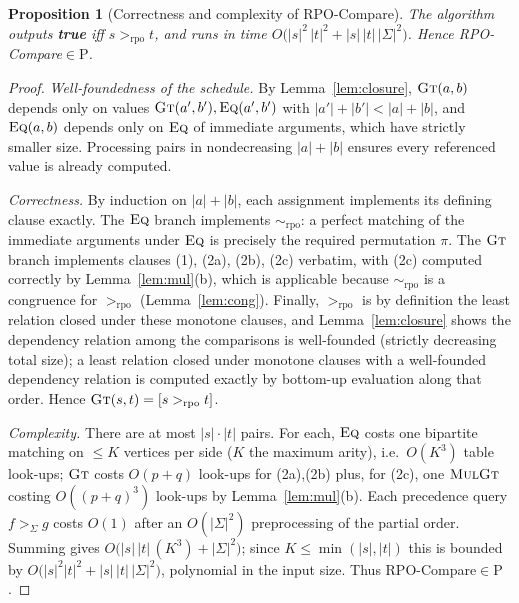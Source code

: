\documentclass{amsart}
\newtheorem{proposition}{Proposition}
\theoremstyle{definition}
\theoremstyle{remark}
\newcommand{\rpo}{>_{\mathrm{rpo}}}
\newcommand{\sig}{\Sigma}
\newcommand{\prc}{>_{\sig}}
\newcommand{\size}[1]{|#1|}
\begin{document}
\begin{proposition}[Correctness and complexity of {\sc RPO-Compare}]\label{prop:rpo}
The algorithm outputs \textbf{true} iff $s\rpo t$, and runs in time
$O\bigl(\size{s}^2\,\size{t}^2+\size{s}\,\size{t}\,\size{\sig}^2\bigr)$. Hence
{\sc RPO-Compare}$\in\mathrm{P}$.
\end{proposition}

\begin{proof}
\emph{Well-foundedness of the schedule.} By Lemma~\ref{lem:closure},
$\textsc{Gt}(a,b)$ depends only on values $\textsc{Gt}(a',b'),\textsc{Eq}(a',b')$
with $\size{a'}+\size{b'}<\size{a}+\size{b}$, and $\textsc{Eq}(a,b)$ depends only
on $\textsc{Eq}$ of immediate arguments, which have strictly smaller size.
Processing pairs in nondecreasing $\size{a}+\size{b}$ ensures every referenced
value is already computed.

\emph{Correctness.} By induction on $\size{a}+\size{b}$, each assignment
implements its defining clause exactly. The $\textsc{Eq}$ branch implements
$\sim_{\mathrm{rpo}}$: a perfect matching of the immediate arguments under
$\textsc{Eq}$ is precisely the required permutation $\pi$. The $\textsc{Gt}$
branch implements clauses (1), (2a), (2b), (2c) verbatim, with (2c) computed
correctly by Lemma~\ref{lem:mul}(b), which is applicable because
$\sim_{\mathrm{rpo}}$ is a congruence for $\rpo$ (Lemma~\ref{lem:cong}). Finally,
$\rpo$ is by definition the least relation closed under these monotone clauses,
and Lemma~\ref{lem:closure} shows the dependency relation among the comparisons
is well-founded (strictly decreasing total size); a least relation closed under
monotone clauses with a well-founded dependency relation is computed exactly by
bottom-up evaluation along that order. Hence $\textsc{Gt}(s,t)=[s\rpo t]$.

\emph{Complexity.} There are at most $\size{s}\cdot\size{t}$ pairs. For each,
$\textsc{Eq}$ costs one bipartite matching on $\le K$ vertices per side ($K$ the
maximum arity), i.e.\ $O(K^{3})$ table look-ups; $\textsc{Gt}$ costs $O(p+q)$
look-ups for (2a),(2b) plus, for (2c), one $\textsc{MulGt}$ costing $O((p+q)^{3})$
look-ups by Lemma~\ref{lem:mul}(b). Each precedence query $f\prc g$ costs
$O(1)$ after an $O(\size{\sig}^2)$ preprocessing of the partial order. Summing
gives $O\bigl(\size{s}\,\size{t}\,(K^{3})+\size{\sig}^2\bigr)$; since
$K\le\min(\size{s},\size{t})$ this is bounded by
$O\bigl(\size{s}^2\size{t}^2+\size{s}\,\size{t}\,\size{\sig}^2\bigr)$, polynomial
in the input size. Thus {\sc RPO-Compare}$\in\mathrm{P}$.
\end{proof}
\end{document}

